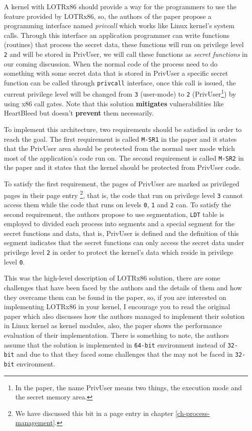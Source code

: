 A kernel with LOTRx86 should provide a way for the programmers to use
the feature provided by LOTRx86, so, the authors of the paper propose a
programming interface named \emph{privcall} which works like Linux
kernel's system calls. Through this interface an application programmer
can write functions (routines) that process the secret data, these
functions will run on privilege level \lstinline!2! and will be stored
in PrivUser, we will call these functions as \emph{secret functions} in
our coming discussion. When the normal code of the process need to do
something with some secret data that is stored in PrivUser a specific
secret function can be called through \lstinline!privcall! interface,
once this call is issued, the current privilege level will be changed
from \lstinline!3! (user-mode) to \lstinline!2! (PrivUser\footnote{In
  the paper, the name PrivUser means two things, the execution mode and
  the secret memory area.}) by using x86 call gates. Note that this
solution \textbf{mitigates} vulnerabilities like HeartBleed but doesn't
\textbf{prevent} them necessarily.

To implement this architecture, two requirements should be satisfied in
order to reach the goal. The first requirement is called
\lstinline!M-SR1! in the paper and it states that the PrivUser area
should be protected from the normal user mode which most of the
application's code run on. The second requirement is called
\lstinline!M-SR2! in the paper and it states that the kernel should be
protected from PrivUser code.

To satisfy the first requirement, the pages of PrivUser are marked as
privileged pages in their page entry \footnote{We have discussed this
  bit in a page entry in chapter \ref{ch-process-management}.}, that is,
the code that run on privilege level \lstinline!3! cannot access them
while the code that runs on levels \lstinline!0!, \lstinline!1! and
\lstinline!2! can. To satisfy the second requirement, the authors
propose to use segmentation, \lstinline!LDT! table is employed to
divided each process into segments and a special segment for the secret
functions and data, that is, PrivUser is defined and the definition of
this segment indicates that the secret functions can only access the
secret data under privilege level \lstinline!2! in order to protect the
kernel's data which reside in privilege level \lstinline!0!.

This was the high-level description of LOTRx86 solution, there are some
challenges that have been faced by the authors and the details of them
and how they overcame them can be found in the paper, so, if you are
interested on implementing LOTRx86 in your kernel, I encourage you to
read the original paper which also discusses how the authors managed to
implement their solution in Linux kernel as kernel modules, also, the
paper shows the performance evaluation of their implementation. There is
something to note, the authors assume that the solution is implemented
in \lstinline!64-bit! environment instead of \lstinline!32-bit! and due
to that they faced some challenges that the may not be faced in
\lstinline!32-bit! environment.

